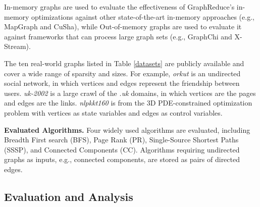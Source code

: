 In-memory graphs are used to evaluate the effectiveness of GraphReduce's in-memory optimizations against other state-of-the-art in-memory 
approaches (e.g., MapGraph and CuSha), while Out-of-memory graphs are used to evaluate it against frameworks that can process large graph 
sets (e.g., GraphChi and X-Stream). 

The ten real-world graphs listed in Table \ref{datasets} are publicly available and cover a wide range of sparsity and sizes. 
For example, \textit{orkut} is an undirected social network, in which vertices and edges represent the friendship between users. 
\textit{uk-2002} is a large crawl of the \textit{.uk} domains, in which vertices are the pages and edges are the links. 
\textit{nlpkkt160} is from the 3D PDE-constrained optimization problem with vertices as state variables and edges as control variables. 

\textbf{Evaluated Algorithms.} Four widely used algorithms are evaluated, including Breadth First search (BFS), Page Rank (PR), 
Single-Source Shortest Paths (SSSP), and Connected Components (CC). Algorithms requiring undirected graphs as inputs, e.g., 
connected components, are stored as pairs of directed edges.




\subsection{Evaluation and Analysis}
\label{6.1}





